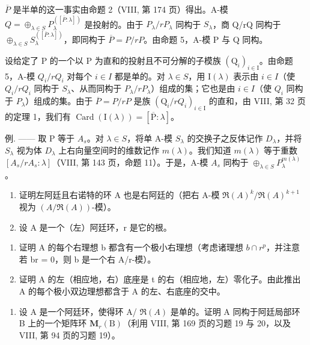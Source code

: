 \(\overline{P}\) 是半单的这一事实由命题 2（VIII, 第 174 页）得出。A-模 \(Q = \oplus_{\lambda \in S} P_{\lambda}^{([\overline{P}: \lambda])}\) 是投射的。由于 \(P_{\lambda}/rP_{\lambda}\) 同构于 \(S_{\lambda}\)，商 Q/rQ 同构于 \(\oplus_{\lambda \in S} S_{\lambda}^{([\overline{P}: \lambda])}\)，即同构于 \(\overline{P} = P/rP\)。由命题 5，A-模 P 与 Q 同构。

设给定了 P 的一个以 P 为直和的投射且不可分解的子模族 \((\mathrm{Q}_{i})_{i\in\mathrm{I}}\)。由命题 5，A-模 \(Q_{i}/rQ_{i}\) 对每个 \(i\in I\) 都是单的。对 \(\lambda\in S\)，用 \(\mathrm{I}(\lambda)\) 表示由 \(i\in I\)（使 \(Q_{i}/rQ_{i}\) 同构于 \(S_{\lambda}\)、从而同构于 \(P_{\lambda}/rP_{\lambda}\)）组成的集；它也是由 \(i\in I\)（使 \(Q_{i}\) 同构于 \(P_{\lambda}\)）组成的集。由于 \(\overline{P}=P/rP\) 是族 \((\mathrm{Q}_{i}/rQ_{i})_{i\in\mathrm{I}}\) 的直和，由 VIII, 第 32 页的定理 1，我们有 \(\operatorname{Card}(\mathrm{I}(\lambda))=[\overline{\mathrm{P}}:\lambda]\)。

例. —— 取 P 等于 \(A_{s}\)。对 \(\lambda \in S\)，将单 A-模 \(S_{\lambda}\) 的交换子之反体记作 \(D_{\lambda}\)，并将 \(S_{\lambda}\) 视为体 \(D_{\lambda}\) 上右向量空间时的维数记作 \(m(\lambda)\)。我们知道 \(m(\lambda)\) 等于重数 \([A_{s}/rA_{s} : \lambda]\)（VIII, 第 143 页，命题 11）。于是，A-模 \(A_{s}\) 同构于 \(\oplus_{\lambda \in S} P_{\lambda}^{m(\lambda)}\)。


\begin{enumerate}
\def\labelenumi{\arabic{enumi})}
\item
  证明左阿廷且右诺特的环 A 也是右阿廷的（把右 A-模 \(\Re(A)^{k}/\Re(A)^{k+1}\) 视为 \((A/\Re(A))\)-模）。
\item
  设 A 是一个（左）阿廷环，r 是它的根。
\end{enumerate}

\begin{enumerate}
\def\labelenumi{\alph{enumi})}
\item
  证明 A 的每个右理想 b 都含有一个极小右理想（考虑诸理想 \(b \cap r^{p}\)，并注意若 br = 0，则 b 是一个右 A/r-模）。
\item
  证明 A 的左（相应地，右）底座是 t 的右（相应地，左）零化子。由此推出 A 的每个极小双边理想都含于 A 的左、右底座的交中。
\end{enumerate}

\begin{enumerate}
\def\labelenumi{\arabic{enumi})}
\setcounter{enumi}{2}
\tightlist
\item
  设 A 是一个阿廷环，使得环 A/ \(\Re(A)\) 是单的。证明 A 同构于阿廷局部环 B 上的一个矩阵环 \(\mathbf{M}_{r}(\mathrm{B})\)（利用 VIII, 第 169 页的习题 19 与 20，以及 VIII, 第 94 页的习题 19）。
\end{enumerate}

